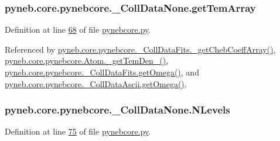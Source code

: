 \hypertarget{classpyneb_1_1core_1_1pynebcore_1_1___coll_data_none_a75bd94e0404dbdad86ce0cd849331b6d}{}
\subsubsection[{get\+Tem\+Array}]{\setlength{\rightskip}{0pt plus 5cm}pyneb.\+core.\+pynebcore.\+\_\+\+Coll\+Data\+None.\+get\+Tem\+Array}\label{classpyneb_1_1core_1_1pynebcore_1_1___coll_data_none_a75bd94e0404dbdad86ce0cd849331b6d}


Definition at line \hyperlink{pynebcore_8py_source_l00068}{68} of file \hyperlink{pynebcore_8py_source}{pynebcore.\+py}.



Referenced by \hyperlink{pynebcore_8py_source_l00734}{pyneb.\+core.\+pynebcore.\+\_\+\+Coll\+Data\+Fits.\+\_\+get\+Cheb\+Coeff\+Array()}, \hyperlink{pynebcore_8py_source_l01803}{pyneb.\+core.\+pynebcore.\+Atom.\+\_\+get\+Tem\+Den\+\_()}, \hyperlink{pynebcore_8py_source_l00811}{pyneb.\+core.\+pynebcore.\+\_\+\+Coll\+Data\+Fits.\+get\+Omega()}, and \hyperlink{pynebcore_8py_source_l01063}{pyneb.\+core.\+pynebcore.\+\_\+\+Coll\+Data\+Ascii.\+get\+Omega()}.

\hypertarget{classpyneb_1_1core_1_1pynebcore_1_1___coll_data_none_a194d717f8c873199de6a3e0cb7d7a96b}{}
\subsubsection[{N\+Levels}]{\setlength{\rightskip}{0pt plus 5cm}pyneb.\+core.\+pynebcore.\+\_\+\+Coll\+Data\+None.\+N\+Levels}\label{classpyneb_1_1core_1_1pynebcore_1_1___coll_data_none_a194d717f8c873199de6a3e0cb7d7a96b}


Definition at line \hyperlink{pynebcore_8py_source_l00075}{75} of file \hyperlink{pynebcore_8py_source}{pynebcore.\+py}.



